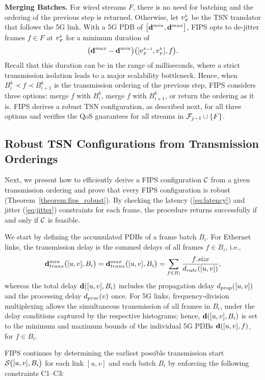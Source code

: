 \textbf{Merging Batches.}
For wired streams $F$, there is no need for batching and the ordering of the previous step is returned. 
Otherwise, let $\v{k}{F}$ be the TSN translator that follows the 5G link.
With a 5G PDB of $\dpdbfull{}$, FIPS opts to de-jitter frames $f \in F$ at $\v{k}{F}$ for a minimum duration of 
\begin{equation*}
  \sub{\dpdbmax}{\dpdbmin}{[\v{k-1}{F}, \v{k}{F}], f}.
\end{equation*}
Recall that this duration can be in the range of milliseconds, where a strict transmission isolation leads to a major scalability bottleneck.
Hence, when $B_i^k \prec f \prec B_{i+1}^k$ is the transmission ordering of the previous step, FIPS considers three options:
merge $f$ with $B_i^k$, merge $f$ with $B_{i+1}^k$, or return the ordering as it is.
FIPS derives a robust TSN configuration, as described next, for all three options and verifies the QoS guarantees for all streams in $\TT_{j-1} \cup \{F\}$.

\subsection{Robust TSN Configurations from Transmission Orderings} \label{sec:fips:configuration}
Next, we present how to efficiently derive a FIPS configuration $\Conf$ from a given transmission ordering and prove that every FIPS configuration is robust (Theorem~\ref{theorem:fips_robust}).
By checking the latency (\ref{eq:latency}) and jitter (\ref{eq:jitter}) constraints for each frame, the procedure returns successfully if and only if $\Conf$ is feasible.

We start by defining the accumulated PDBs of a frame batch $B_i$.
For Ethernet links, the transmission delay is the summed delays of all frames $f \in B_i$, i.e.,
\begin{equation*}
  \dpdbtransmin{[u,v], B_i} = \dpdbtransmax{[u,v], B_i} = \sum_{f \in B_i} \frac{\size{f}}{\drate{[u,v]}},
\end{equation*}
whereas the total delay $\dpdb{[u,v], B_i}$ includes the propagation delay $\dprop{[u,v]}$ and the processing delay $\dproc{v}$ once.
For 5G links, frequency-division multiplexing allows the simultaneous transmission of all frames in $B_i$, under the delay conditions captured by the respective histograms;
hence, $\dpdb{[u,v], B_i}$ is set to the minimum and maximum bounds of the individual 5G PDBs $\dpdb{[u,v], f}$, for $f \in B_i$.

FIPS continues by determining the earliest possible transmission start $\S{[u,v], B_i}$ for each link $[u,v]$ and each batch $B_i$ by enforcing the following constraints C1--C3: 

